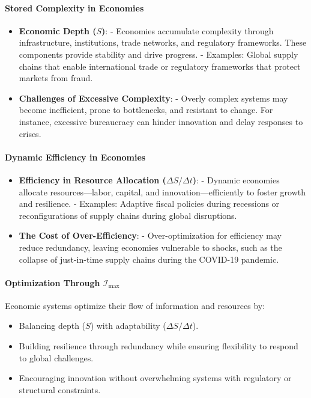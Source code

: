 \documentclass[12pt]{article}
\begin{document}
\paragraph{Stored Complexity in Economies}
\begin{itemize}
    \item \textbf{Economic Depth (\( S \))}:
        - Economies accumulate complexity through infrastructure, institutions, trade networks, and regulatory frameworks. These components provide stability and drive progress.
        - Examples: Global supply chains that enable international trade or regulatory frameworks that protect markets from fraud.
    \item \textbf{Challenges of Excessive Complexity}:
        - Overly complex systems may become inefficient, prone to bottlenecks, and resistant to change. For instance, excessive bureaucracy can hinder innovation and delay responses to crises.
\end{itemize}

\paragraph{Dynamic Efficiency in Economies}
\begin{itemize}
    \item \textbf{Efficiency in Resource Allocation (\( \Delta S / \Delta t \))}:
        - Dynamic economies allocate resources—labor, capital, and innovation—efficiently to foster growth and resilience.
        - Examples: Adaptive fiscal policies during recessions or reconfigurations of supply chains during global disruptions.
    \item \textbf{The Cost of Over-Efficiency}:
        - Over-optimization for efficiency may reduce redundancy, leaving economies vulnerable to shocks, such as the collapse of just-in-time supply chains during the COVID-19 pandemic.
\end{itemize}

\paragraph{Optimization Through \(\mathcal{I}_{\text{max}}\)}
Economic systems optimize their flow of information and resources by:
\begin{itemize}
    \item Balancing depth (\( S \)) with adaptability (\( \Delta S / \Delta t \)).
    \item Building resilience through redundancy while ensuring flexibility to respond to global challenges.
    \item Encouraging innovation without overwhelming systems with regulatory or structural constraints.
\end{itemize}
\end{document}
